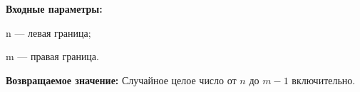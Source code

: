 \textbf{Входные параметры:}

n --- левая граница;

 m --- правая граница.

\textbf{Возвращаемое значение:}
Случайное целое число от $n$ до $m-1$ включительно.